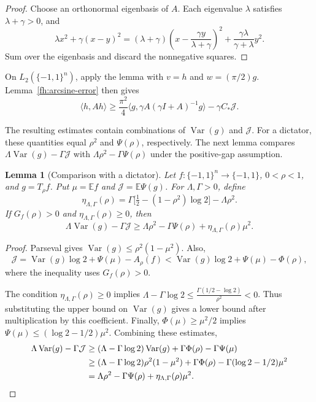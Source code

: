 \documentclass[11pt,letterpaper]{amsart}
\newcommand{\E}{\mathbb E}
\newcommand{\1}{\mathbf 1}
\DeclareMathOperator{\Var}{Var}
\newtheorem{lemma}[theorem]{Lemma}
\numberwithin{equation}{section}
\begin{document}
\begin{proof}
Choose an orthonormal eigenbasis of $A$.
Each eigenvalue $\lambda$ satisfies $\lambda+\gamma>0$,
and
\[
 \lambda x^2+\gamma(x-y)^2
 =(\lambda+\gamma)
   \left(x-\frac{\gamma y}{\lambda+\gamma}\right)^2
  +\frac{\gamma\lambda}{\gamma+\lambda}y^2.
\]
Sum over the eigenbasis and discard the nonnegative squares.
\end{proof}

On $L_2(\{-1,1\}^n)$, apply the lemma with
$v=h$ and $w=(\pi/2)g$.
Lemma~\ref{fh:arcsine-error} then gives
\[
 \langle h,Ah\rangle
 \ge\frac{\pi^2}{4}
     \langle g,\gamma A(\gamma I+A)^{-1}g\rangle
     -\gamma C_*\mathcal J.
\]

The resulting estimates contain combinations of
$\Var(g)$ and $\mathcal J$.
For a dictator, these quantities equal $\rho^2$ and
$\Psi(\rho)$, respectively.
The next lemma compares
$\Lambda\Var(g)-\Gamma\mathcal J$ with
$\Lambda\rho^2-\Gamma\Psi(\rho)$ under the positive-gap
assumption.

\begin{lemma}[Comparison with a dictator]\label{ub:transfer}
Let $f:\{-1,1\}^n\to\{-1,1\}$, $0<\rho<1$, and $g=T_\rho f$.
Put $\mu=\E f$ and $\mathcal J=\E\Psi(g)$.
For $\Lambda,\Gamma>0$, define
\begin{equation}\label{eq:mean-transfer}
 \eta_{\Lambda,\Gamma}(\rho)
 =\Gamma\bigl[\tfrac12-(1-\rho^2)\log2\bigr]
  -\Lambda\rho^2.
\end{equation}
If $G_f(\rho)>0$ and $\eta_{\Lambda,\Gamma}(\rho)\ge0$, then
\[
 \Lambda\Var(g)-\Gamma\mathcal J
 \ge\Lambda\rho^2-\Gamma\Psi(\rho)
       +\eta_{\Lambda,\Gamma}(\rho)\mu^2.
\]
\end{lemma}

\begin{proof}
Parseval gives $\Var(g)\le\rho^2(1-\mu^2)$.
Also,
\[
 \mathcal J
 =\Var(g)\log2+\Psi(\mu)-A_\rho(f)
 <\Var(g)\log2+\Psi(\mu)-\Phi(\rho),
\]
where the inequality uses $G_f(\rho)>0$.

The condition $\eta_{\Lambda,\Gamma}(\rho)\ge0$ implies
$\Lambda-\Gamma\log2
 \le\frac{\Gamma(1/2-\log2)}{\rho^2}<0$.
Thus substituting the upper bound on $\Var(g)$ gives a
lower bound after multiplication by this coefficient.
Finally, $\Phi(\mu)\ge\mu^2/2$ implies
$\Psi(\mu)\le(\log2-1/2)\mu^2$.
Combining these estimates,
 \begin{align*}
 \Lambda\Var(g)-\Gamma\mathcal J
 &\ge(\Lambda-\Gamma\log2)\Var(g)
       +\Gamma\Phi(\rho)-\Gamma\Psi(\mu)\\
 &\ge(\Lambda-\Gamma\log2)\rho^2(1-\mu^2)
       +\Gamma\Phi(\rho)
       -\Gamma(\log2-1/2)\mu^2\\
 &=\Lambda\rho^2-\Gamma\Psi(\rho)
       +\eta_{\Lambda,\Gamma}(\rho)\mu^2. \qedhere
 \end{align*}
\end{proof}
\end{document}
